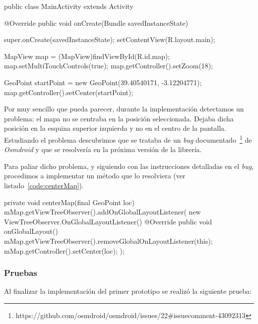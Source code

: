 \begin{listing}[
  float=ht,
  language = java,
  caption  = {Ejemplo de \texttt{activity} mostrando un punto de un mapa en específico},
  label    = code:activityMapView]
public class MainActivity extends Activity {
    @Override
    public void onCreate(Bundle savedInstanceState) {
        super.onCreate(savedInstanceState);
        setContentView(R.layout.main);

        MapView map = (MapView)findViewById(R.id.map);
        map.setMultiTouchControls(true);
        map.getController().setZoom(18);

        GeoPoint startPoint = new GeoPoint(39.40540171, -3.12204771);
        map.getController().setCenter(startPoint);
    }
}
\end{listing}

Por muy sencillo que pueda parecer, durante la implementación detectamos un problema: el mapa no se
centraba en la posición seleccionada. Dejaba dicha posición en la esquina superior izquierda y no en
el centro de la pantalla. Estudiando el problema descubrimos que se trataba de un \emph{bug}
documentado~\footnote{https://github.com/osmdroid/osmdroid/issues/22\#issuecomment-43092313} de
\emph{Osmdroid} y que se resolvería en la próxima versión de la librería.

Para paliar dicho problema, y siguiendo con las instrucciones detalladas en el \emph{bug},
procedimos a implementar un método que lo resolviera (ver listado~\ref{code:centerMap}).

\begin{listing}[
  float=ht,
  language = java,
  caption  = {Método utilizado para centrar el mapa en cualquier posición},
  label    = code:centerMap]
private void centerMap(final GeoPoint loc) {
  mMap.getViewTreeObserver().addOnGlobalLayoutListener(
          new ViewTreeObserver.OnGlobalLayoutListener() {
    @Override
    public void onGlobalLayout() {
      mMap.getViewTreeObserver().removeGlobalOnLayoutListener(this);
      mMap.getController().setCenter(loc);
    }
  });
}
\end{listing}

\subsubsection{Pruebas}

Al finalizar la implementación del primer prototipo se realizó la siguiente prueba:

